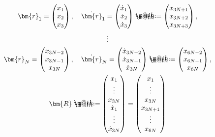 \documentclass[openany, a4paper, oneside]{book}
\makeatletter
\newcommand*{\defeq}{\mathrel{\rlap{%
\raisebox{0.3ex}{$\m@th\cdot$}}%
\raisebox{-0.3ex}{$\m@th\cdot$}}%
=}
\theoremstyle{break}
\theoremstyle{breakdefn}
\makeatother
\begin{document}
\begin{gather}
\bm{r}_1 =
\begin{pmatrix}
x_1 \\
x_2 \\
x_3 \\
\end{pmatrix}
, \quad
\dot{ \bm{r} }_1
=
\begin{pmatrix}
\dot{ x }_1 \\
\dot{ x }_2 \\
\dot{ x }_3 \\
\end{pmatrix}
\defeq
\begin{pmatrix}
x_{3N+1} \\
x_{3N+2} \\
x_{3N+3}\\
\end{pmatrix} , \\
\vdots \\
\bm{r}_N =
\begin{pmatrix}
x_{3N-2} \\
x_{3N-1} \\
x_{3N} \\
\end{pmatrix}
, \quad
\dot{ \bm{r} }_N
=
\begin{pmatrix}
\dot{ x }_{3N-2} \\
\dot{ x }_{3N-1} \\
\dot{ x }_{3N} \\
\end{pmatrix}
\defeq
\begin{pmatrix}
x_{6N-2} \\
x_{6N-1} \\
x_{6N} \\
\end{pmatrix} , \\
\bm{R}
\defeq
\begin{pmatrix}
x_1 \\
\vdots \\
x_{3N} \\
\dot{x}_1 \\
\vdots \\
\dot{x}_{3N}
\end{pmatrix}
=
\begin{pmatrix}
x_1 \\
\vdots \\
x_{3N} \\
x_{3N+1} \\
\vdots \\
x_{6N}
\end{pmatrix}

\end{gather}
\end{document}
